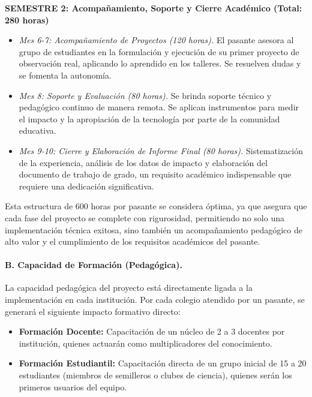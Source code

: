 \textbf{SEMESTRE 2: Acompañamiento, Soporte y Cierre Académico (Total: 280 horas)}
\begin{itemize}
    \item \textit{Mes 6-7: Acompañamiento de Proyectos (120 horas).} El pasante asesora al grupo de estudiantes en la formulación y ejecución de su primer proyecto de observación real, aplicando lo aprendido en los talleres. Se resuelven dudas y se fomenta la autonomía.
    
    \item \textit{Mes 8: Soporte y Evaluación (80 horas).} Se brinda soporte técnico y pedagógico continuo de manera remota. Se aplican instrumentos para medir el impacto y la apropiación de la tecnología por parte de la comunidad educativa.
    
    \item \textit{Mes 9-10: Cierre y Elaboración de Informe Final (80 horas).} Sistematización de la experiencia, análisis de los datos de impacto y elaboración del documento de trabajo de grado, un requisito académico indispensable que requiere una dedicación significativa.
\end{itemize}

Esta estructura de 600 horas por pasante se considera óptima, ya que asegura que cada fase del proyecto se complete con rigurosidad, permitiendo no solo una implementación técnica exitosa, sino también un acompañamiento pedagógico de alto valor y el cumplimiento de los requisitos académicos del pasante.

\paragraph{B. Capacidad de Formación (Pedagógica).}
La capacidad pedagógica del proyecto está directamente ligada a la implementación en cada institución. Por cada colegio atendido por un pasante, se generará el siguiente impacto formativo directo:
\begin{itemize}
    \item \textbf{Formación Docente:} Capacitación de un núcleo de 2 a 3 docentes por institución, quienes actuarán como multiplicadores del conocimiento.
    
    \item \textbf{Formación Estudiantil:} Capacitación directa de un grupo inicial de 15 a 20 estudiantes (miembros de semilleros o clubes de ciencia), quienes serán los primeros usuarios del equipo.
\end{itemize}

